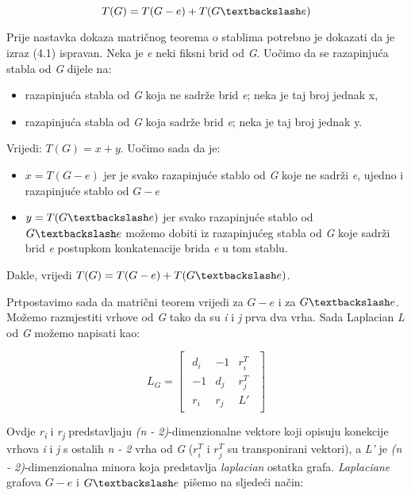 \documentclass[times, utf8, zavrsni]{fer}
\begin{document}
\begin{equation}
	T(G) = T(G - e) + T(G \textbackslash e)
\end{equation}

Prije nastavka dokaza matričnog teorema o stablima potrebno je dokazati da je izraz (4.1) ispravan. Neka je \textit{e} neki fiksni brid od \textit{G}. Uočimo da se razapinjuća stabla od \textit{G} dijele na:
\begin{itemize}
	\item razapinjuća stabla od \textit{G} koja ne sadrže brid \textit{e}; neka je taj broj jednak x,
	\item razapinjuća stabla od \textit{G} koja sadrže brid \textit{e}; neka je taj broj jednak y.
\end{itemize}
Vrijedi: $T(G) = x + y$. Uočimo sada da je:
\begin{itemize}
	\item $x = T(G - e)$ jer je svako razapinjuće stablo od \textit{G} koje ne sadrži \textit{e}, ujedno i razapinjuće stablo od $G - e$
	\item $y = T(G \textbackslash e)$ jer svako razapinjuće stablo od $G \textbackslash e$ možemo dobiti iz razapinjućeg stabla od \textit{G} koje sadrži brid \textit{e} postupkom konkatenacije brida \textit{e} u tom stablu.
\end{itemize}
Dakle, vrijedi $T(G) = T(G - e) + T(G \textbackslash e)$.

Prtpostavimo sada da matrični teorem vrijedi za $G - e$ i za $G \textbackslash e$. Možemo razmjestiti vrhove od \textit{G} tako da su \textit{i} i \textit{j} prva dva vrha. Sada Laplacian \textit{L} od \textit{G} možemo napisati kao:

\[
L_G =
\begin{bmatrix}
	\begin{array}{c|c|c}
		d_i & -1 & r_i^T \\
		\hline
		-1 & d_j & r_j^T \\
		\hline
		r_i & r_j & L'
	\end{array}
\end{bmatrix}
\]

Ovdje \textit{r\textsubscript{i}} i \textit{r\textsubscript{j}} predstavljaju \textit{(n - 2)}-dimenzionalne vektore koji opisuju konekcije vrhova \textit{i} i \textit{j} s ostalih \textit{n - 2} vrha od \textit{G} ($r_i^T$ i $r_j^T$ su transponirani vektori), a \textit{L'} je \textit{(n - 2)}-dimenzionalna minora koja predstavlja \textit{laplacian} ostatka grafa. \textit{Laplaciane} grafova $G - e$ i $G \textbackslash e$ pišemo na sljedeći način:
\end{document}
